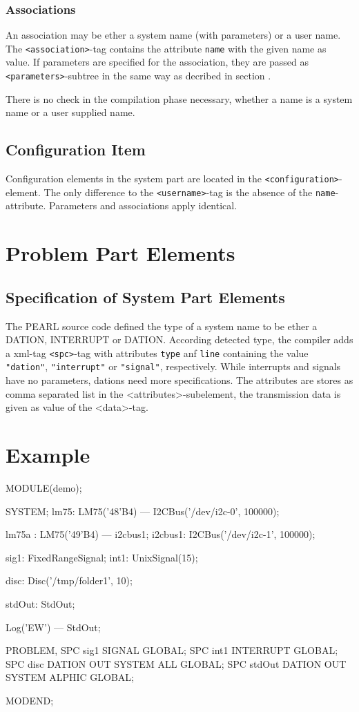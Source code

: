 \subsubsection{Associations}
An association may be ether a system name (with parameters) or a user name.
The  \verb|<association>|-tag contains the attribute \verb|name| with the 
given name as value. If parameters are specified for the association,
they are passed as \verb|<parameters>|-subtree in the same way as decribed 
in section \label{sec_system_names}.

There is no check in the compilation phase necessary,
whether a name is a system name
or a user supplied name.


\subsection{Configuration Item}
Configuration elements in the system part are located in the
\verb|<configuration>|-element. 
The only difference to the \verb|<username>|-tag is the absence of the 
\verb|name|-attribute. Parameters and associations apply identical.

\section{Problem Part Elements}
\subsection{Specification of System Part Elements}
The PEARL source code defined the type of a system name to be ether a DATION, 
INTERRUPT or DATION. According detected type, the compiler 
adds a xml-tag \verb|<spc>|-tag with attributes \verb|type| anf \verb|line|
containing the value \verb|"dation"|, \verb|"interrupt"| or \verb|"signal"|,
 respectively.
While interrupts and signals have no parameters, dations need more
specifications. The attributes are stores as comma separated list in the
<attributes>-subelement, the transmission data is given as value
of the <data>-tag.

\section{Example}
\begin{PEARLCode}
MODULE(demo);

SYSTEM;
  lm75: LM75('48'B4) --- I2CBus('/dev/i2c-0', 100000);

  lm75a : LM75('49'B4) --- i2cbus1;
  i2cbus1: I2CBus('/dev/i2c-1', 100000);

  sig1: FixedRangeSignal;
  int1: UnixSignal(15);

  disc: Disc('/tmp/folder1', 10);
  
  stdOut: StdOut;

  Log('EW') --- StdOut;

PROBLEM,
  SPC sig1 SIGNAL GLOBAL;
  SPC int1 INTERRUPT GLOBAL;
  SPC disc DATION OUT SYSTEM ALL GLOBAL;
  SPC stdOut DATION OUT SYSTEM ALPHIC GLOBAL;

MODEND;
\end{PEARLCode}

